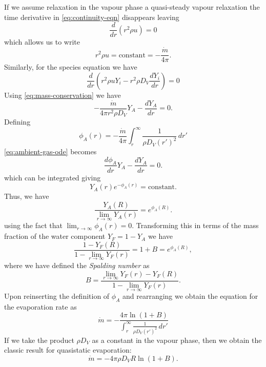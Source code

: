 \documentclass[12pt,twoside]{report}
\begin{document}
If we assume relaxation in the vapour phase a quasi-steady vapour relaxation the time derivative in \eqref{eq:continuity-eqn} disappears leaving
\begin{equation}
  \frac{d}{dr} ( r^2 \rho u ) = 0
\end{equation}
which allows us to write
\begin{equation}\label{eq:mass-conservation}
  r ^2 \rho u = \textrm{constant} = -\frac{\dot{m}}{4\pi}.
\end{equation}
Similarly, for the species equation we have
\begin{equation}
  \frac{d}{dr} \left(
  r^2 \rho u Y_i - r^2 \rho D_V \frac{d Y_i}{dr}
  \right) = 0
  \label{eq:quasistatic-vapour-species-conservation}
\end{equation}
Using \eqref{eq:mass-conservation} we have
\begin{equation}\label{eq:ambient-gas-ode}
  -\frac{\dot{m}}{4\pi r^2 \rho D_V} Y_A - \frac{d Y_A}{dr} = 0.
\end{equation}
Defining
\begin{equation*}
  \phi_A(r) = -\frac{\dot{m}}{4\pi}
  \int_r^\infty  \frac{1}{\rho D_V (r')^2} \, dr'
\end{equation*}
\eqref{eq:ambient-gas-ode} becomes
\begin{equation}
  \frac{d\phi_A}{dr} Y_A - \frac{d Y_A}{dr} = 0.
\end{equation}
which can be integrated%
giving
\begin{equation}
  Y_A(r) e^{-\phi_A(r)} = \textrm{constant}.
\end{equation}
Thus, we have
\begin{equation}
  \frac{Y_A(R)}{\displaystyle{\lim_{r \to \infty}} Y_A(r)} = e^{\phi_A(R)}.
\end{equation}
using the fact that $\displaystyle{\lim_{r \to \infty} \phi_A(r) = 0}$.
Transforming this in terms of the mass fraction of the water component $Y_F = 1 - Y_A$ we have
\begin{equation}
  \frac{1 - Y_F(R)}{1 - \displaystyle{\lim_{r \to \infty}} Y_F(r)} =
  1 + B = e^{\phi_A(R)},
\end{equation}
where we have defined the \emph{Spalding number} as
\begin{equation}
  B =
  \frac{\displaystyle{\lim_{r \to \infty}} Y_F(r) - Y_F(R)}
       {1 - \displaystyle{\lim_{r \to \infty}} Y_F(r)}.
\end{equation}
Upon reinserting the definition of $\phi_A$ and rearranging we obtain the equation for the evaporation rate as
\begin{equation}
  \dot{m} = -
  \frac{4\pi \ln{(1 + B)}}
       {\int_r^\infty  \frac{1}{\rho D_V (r')^2} \, dr'}
\end{equation}
If we take the product $\rho D_V$ as a constant in the vapour phase, then we obtain the classic result for quasistatic evaporation:
\begin{equation}
  \dot{m} = - 4\pi \rho D_V R \ln{(1 + B)}.
\end{equation}
\end{document}
